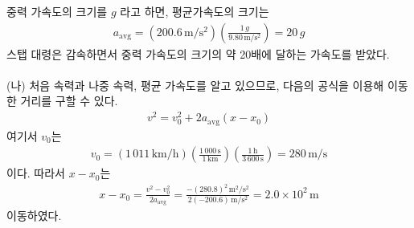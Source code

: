 \documentclass[APS,floatfix,nofootinbib,superscriptaddress,fleqn,preprint]{revtex4}
\begin{document}
\noindent  중력 가속도의 크기를 $g$ 라고 하면, 평균가속도의 크기는 
  \begin{align}
   a_{\mathrm{avg}} =  \left(\mathrm{200.6\,m/s^2}\right)
    \left(\frac{1\,g}{9.80\,\mathrm{m/s^2}}\right)
    = 20 \,g
  \end{align} 
  스탭 대령은 감속하면서 중력 가속도의 크기의 약 20배에 달하는 가속도를 받았다.
  \\
  \\
\noindent (나) 처음 속력과 나중 속력, 평균 가속도를 알고 있으므로,
    다음의 공식을 이용해 이동한 거리를 구할 수 있다. 
  \begin{align}
    v^2=v_0^2+2a_{\mathrm{avg}}(x-x_0)
  \end{align}
  여기서 $v_0$는
  \begin{align*}
    v_0 = (1\,011\,\mathrm{km/h}) \left(
    \frac{1\,000\,\mathrm{s}}{1\,\mathrm{km}}\right) 
    \left(\frac{1\,\mathrm{h}}{3\,600\,\mathrm{s}}\right)
    =280\,\mathrm{m/s}
  \end{align*}
  이다. 따라서 $x-x_0$는 
  \begin{align*}
x-x_0 =   \frac{v^2-v_0^2}{2a_{\mathrm{avg}}} =
    \frac{-(280.8)^2\,\mathrm{m^2/s^2}}{2(-200.6)\,\mathrm{m/s^2}}
   = 2.0\times 10^2\,\mathrm{m} 
 \end{align*}
이동하였다. 
\vspace{0.5cm}
\end{document}
